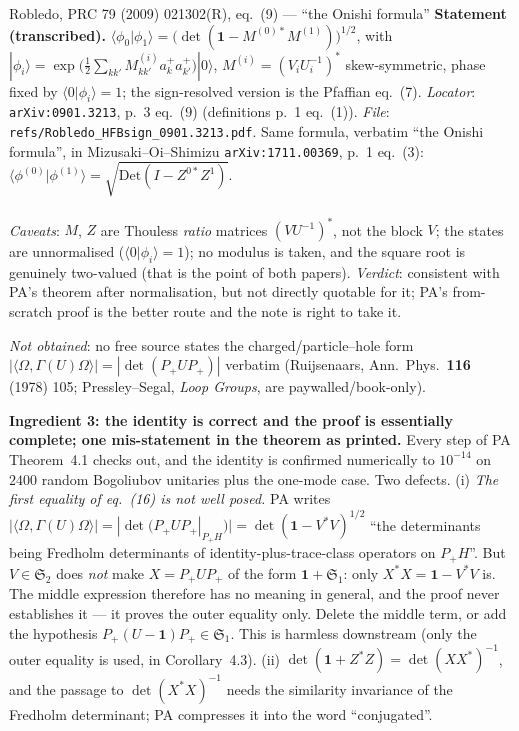 \documentclass[11pt]{article}
\newcommand{\Pp}{P_+}\newcommand{\Pm}{P_-}
\providecommand{\Om}{\Omega}\providecommand{\Gm}{\Gamma}\providecommand{\Qt}{\widetilde Q}
\providecommand{\Stwo}{\mathfrak S_2}\providecommand{\Sone}{\mathfrak S_1}
\providecommand{\ip}[2]{\langle #1,#2\rangle}\providecommand{\one}{\mathbf 1}
\begin{document}
\begin{citedbox}{Robledo, PRC 79 (2009) 021302(R), eq.~(9) --- ``the Onishi formula''}
\textbf{Statement (transcribed).}  $\langle\phi_0|\phi_1\rangle=\bigl(\det(\one-M^{(0)*}M^{(1)})
\bigr)^{1/2}$, with $|\phi_i\rangle=\exp\bigl(\frac12\sum_{kk'}M^{(i)}_{kk'}a^+_ka^+_{k'}\bigr)|0
\rangle$, $M^{(i)}=(V_iU_i^{-1})^*$ skew-symmetric, phase fixed by $\langle0|\phi_i\rangle=1$; the
sign-resolved version is the Pfaffian eq.~(7).  \emph{Locator}: \texttt{arXiv:0901.3213}, p.~3
eq.~(9) (definitions p.~1 eq.~(1)).  \emph{File}: \texttt{refs/Robledo\_HFBsign\_0901.3213.pdf}.
Same formula, verbatim ``the Onishi formula'', in Mizusaki--Oi--Shimizu \texttt{arXiv:1711.00369},
p.~1 eq.~(3): $\langle\phi^{(0)}|\phi^{(1)}\rangle=\sqrt{\mathrm{Det}(I-Z^{0*}Z^1)}$.\\
\\
\emph{Caveats}: $M$, $Z$ are Thouless \emph{ratio} matrices $(VU^{-1})^*$, not the block $V$; the
states are unnormalised ($\langle0|\phi_i\rangle=1$); no modulus is taken, and the square root is
genuinely two-valued (that is the point of both papers).  \emph{Verdict}: consistent with PA's
theorem after normalisation, but not directly quotable for it; PA's from-scratch proof is the better
route and the note is right to take it.
\end{citedbox}
\emph{Not obtained}: no free source states the charged/particle--hole form
$|\ip\Om{\Gm(U)\Om}|=|\det(\Pp U\Pp)|$ verbatim (Ruijsenaars, Ann.\ Phys.\ \textbf{116} (1978) 105;
Pressley--Segal, \emph{Loop Groups}, are paywalled/book-only).

\begin{verdictgap}
\textbf{Ingredient 3: the identity is correct and the proof is essentially complete; one
mis-statement in the theorem as printed.}  Every step of PA Theorem~4.1 checks out, and the identity
is confirmed numerically to $10^{-14}$ on $2400$ random Bogoliubov unitaries plus the one-mode
case.  Two defects.  (i) \emph{The first equality of eq.~(16) is not well posed.}  PA writes
$|\ip\Om{\Gm(U)\Om}|=|\det(\Pp U\Pp|_{\Pp H})|=\det(\one-V^*V)^{1/2}$ ``the determinants being
Fredholm determinants of identity-plus-trace-class operators on $\Pp H$''.  But $V\in\Stwo$ does
\emph{not} make $X=\Pp U\Pp$ of the form $\one+\Sone$: only $X^*X=\one-V^*V$ is.  The middle
expression therefore has no meaning in general, and the proof never establishes it --- it proves the
outer equality only.  Delete the middle term, or add the hypothesis $\Pp(U-\one)\Pp\in\Sone$.  This
is harmless downstream (only the outer equality is used, in Corollary~4.3).  (ii)
$\det(\one+Z^*Z)=\det(XX^*)^{-1}$, and the passage to $\det(X^*X)^{-1}$ needs the similarity
invariance of the Fredholm determinant; PA compresses it into the word ``conjugated''.
\end{verdictgap}
\end{document}
